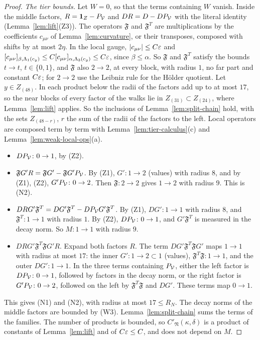 \begin{proof}
\emph{The tier bounds.} Let $W=0$, so that the terms containing $W$ vanish. Inside the middle factors, $R=\mathbf 1_Z-P_\mathcal V$ and $DR=D-DP_\mathcal V$ with the literal identity (Lemma~\ref{lem:lift}(Z3)). The operators $\mathfrak F$ and $\mathfrak F^T$ are multiplications by the coefficients $c_{\mu\nu}$ of Lemma~\ref{lem:curvature}, or their transposes, composed with shifts by at most $2\eta$. In the local gauge, $|c_{\mu\nu}|\le C\varepsilon$ and $[c_{\mu\nu}]_{\beta,\Lambda_1(c_y)}\le C[c_{\mu\nu}]_{\alpha,\Lambda_3(c_y)}\le C\varepsilon$, since $\beta\le\alpha$. So $\mathfrak F$ and $\mathfrak F^T$ satisfy the bounds $t\to t$, $t\in\{0,1\}$, and $\mathfrak F$ also $2\to2$, at every block, with radius $1$, no far part and constant $C\varepsilon$; for $2\to2$ use the Leibniz rule for the H\"older quotient. Let $y\in Z_{(48)}$. In each product below the radii of the factors add up to at most $17$, so the near blocks of every factor of the walks lie in $Z_{(31)}\subset Z_{(24)}$, where Lemma~\ref{lem:lift} applies. So the inclusions of Lemma~\ref{lem:split-chain} hold, with the sets $Z_{(48-r)}$, $r$ the sum of the radii of the factors to the left. Local operators are composed term by term with Lemma~\ref{lem:tier-calculus}(c) and Lemma~\ref{lem:weak-local-ops}(a).
\begin{itemize}
\item[(i)] $DP_\mathcal V\colon0\to1$, by (Z2).
\item[(ii)] $\mathfrak FG'R=\mathfrak FG'-\mathfrak FG'P_\mathcal V$. By (Z1), $G'\colon1\to2$ (values) with radius $8$, and by (Z1), (Z2), $G'P_\mathcal V\colon0\to2$. Then $\mathfrak F\colon2\to2$ gives $1\to2$ with radius $9$. This is (N2).
\item[(iii)] $DRG'\mathfrak F^T=DG'\mathfrak F^T-DP_\mathcal V G'\mathfrak F^T$. By (Z1), $DG'\colon1\to1$ with radius $8$, and $\mathfrak F^T\colon1\to1$ with radius $1$. By (Z2), $DP_\mathcal V\colon0\to1$, and $G'\mathfrak F^T$ is measured in the decay norm. So $M\colon1\to1$ with radius $9$.
\item[(iv)] $DRG'\mathfrak F^T\mathfrak FG'R$. Expand both factors $R$. The term $DG'\mathfrak F^T\mathfrak FG'$ maps $1\to1$ with radius at most $17$: the inner $G'\colon1\to2\subset1$ (values), $\mathfrak F^T\mathfrak F\colon1\to1$, and the outer $DG'\colon1\to1$. In the three terms containing $P_\mathcal V$, either the left factor is $DP_\mathcal V\colon0\to1$, followed by factors in the decay norm, or the right factor is $G'P_\mathcal V\colon0\to2$, followed on the left by $\mathfrak F^T\mathfrak F$ and $DG'$. These terms map $0\to1$.
\end{itemize}
This gives (N1) and (N2), with radius at most $17\le R_N$. The decay norms of the middle factors are bounded by (W3). Lemma~\ref{lem:split-chain} sums the terms of the families. The number of products is bounded, so $C'_{\mathfrak N}(\kappa,\delta)$ is a product of constants of Lemma~\ref{lem:lift} and of $C\varepsilon\le C$, and does not depend on $M$.


\end{proof}
